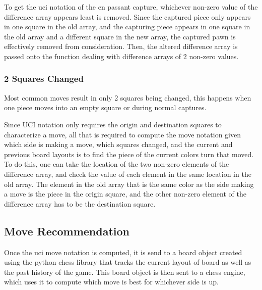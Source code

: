 \documentclass[journal]{IEEEtran}
\begin{document}
To get the uci notation of the en passant capture, whichever non-zero value of the difference array appears least is removed. Since the captured piece only appears in one square in the old array, and the capturing piece appears in one square in the old array and a different square in the new array, the captured pawn is effectively removed from consideration. Then, the altered difference array is passed onto the function dealing with difference arrays of 2 non-zero values.

\subsubsection{2 Squares Changed}
Most common moves result in only 2 squares being changed, this happens when one piece moves into an empty square or during normal captures.

Since UCI notation only requires the origin and destination squares to characterize a move, all that is required to compute the move notation given which side is making a move, which squares changed, and the current and previous board layouts is to find the piece of the current colors turn that moved. To do this, one can take the location of the two non-zero elements of the difference array, and check the value of each element in the same location in the old array. The element in the old array that is the same color as the side making a move is the piece in the origin square, and the other non-zero element of the difference array has to be the destination square.

\subsection{Move Recommendation}
\label{MoveRec}
Once the uci move notation is computed, it is send to a board object created using the python chess library that tracks the current layout of board as well as the past history of the game. This board object is then sent to a chess engine, which uses it to compute which move is best for whichever side is up.
\end{document}
